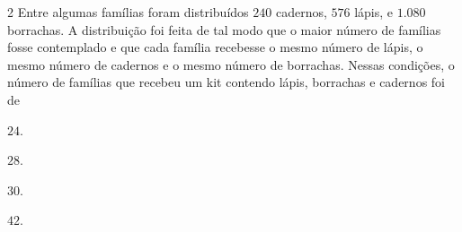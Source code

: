

\num{2}  Entre algumas famílias foram distribuídos $240$ cadernos, $576$ lápis, e
$1.080$ borrachas. A distribuição foi feita de tal modo que o maior número
de famílias fosse contemplado e que cada família recebesse o mesmo
número de lápis, o mesmo número de cadernos e o mesmo número de
borrachas. Nessas condições, o número de famílias que recebeu um kit
contendo lápis, borrachas e cadernos foi de

\begin{multicols}{2}
\begin{escolha}
\item $24$.
\item $28$.
\item $30$.
\item $42$.
\end{escolha}
\end{multicols}



